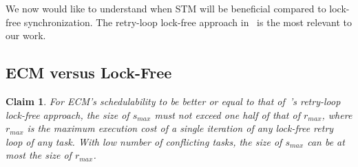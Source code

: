 \documentclass[letter]{sig-alternate}
\newtheorem{clm}{Claim}
\begin{document}
We now would like to understand when STM will be beneficial compared to lock-free synchronization. The retry-loop lock-free approach in~\cite{key-5} is the most relevant to our work. 


\subsection{\label{sub:G-EDF-scheduler-with} ECM versus Lock-Free}

\begin{clm}
For ECM's schedulability to be better or equal to that of~\cite{key-5}'s retry-loop lock-free approach,  
the size of $s_{max}$ must not exceed one half of that of $r_{max}$, where $r_{max}$ is the maximum execution cost of a single iteration of any lock-free retry loop of any task. With low number of conflicting tasks, the size of $s_{max}$ can be at most the size of $r_{max}$. 
\end{clm}
\end{document}
